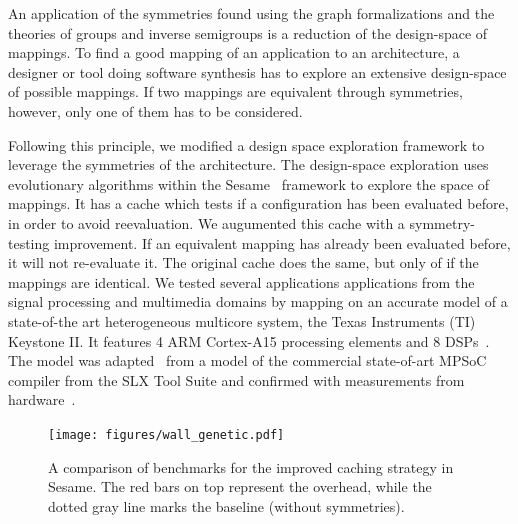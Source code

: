 \documentclass[sigplan,10pt]{acmart}
\begin{document}
An application of the symmetries found using the graph formalizations and the theories of groups and inverse semigroups is a reduction of the design-space of mappings. 
To find a good mapping of an application to an architecture, a designer or tool doing software synthesis has to explore an extensive design-space of possible mappings. 
If two mappings are equivalent through symmetries, however, only one of them has to be considered.

Following this principle, we modified a design space exploration framework to leverage the symmetries of the architecture.
The design-space exploration uses evolutionary algorithms within the Sesame~\cite{sesame} framework to explore the space of mappings. 
It has a cache which tests if a configuration has been evaluated before, in order to avoid reevaluation.
We augumented this cache with a symmetry-testing improvement. If an equivalent mapping has already been evaluated before, it will not re-evaluate it.
The original cache does the same, but only of if the mappings are identical.
We tested several applications applications from the signal processing and multimedia domains by mapping on an accurate model of a state-of-the art heterogeneous multicore system, the Texas Instruments (TI) Keystone II.
It features 4 ARM Cortex-A15 processing elements and 8 DSPs~\cite{keystone2_whitepaper}. 
The model was adapted~\cite{goens_mcsoc16} from a model of the commercial state-of-art MPSoC compiler from the SLX Tool Suite and confirmed with measurements from hardware~\cite{odendahl2013split}.

\begin{figure}
	\centering
	\texttt{[image: figures/wall\_genetic.pdf]}
	\caption{A comparison of benchmarks for the improved caching strategy in Sesame. The red bars on top represent the overhead, while the dotted gray line marks the baseline (without symmetries). }
	\label{fig:genetic_algorithms}
\end{figure}
\end{document}
